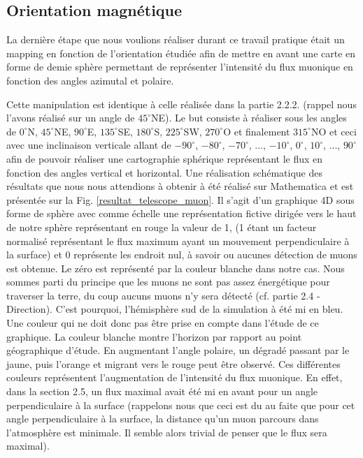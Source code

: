 \documentclass[12pt]{article}
\begin{document}
\subsection{Orientation magnétique}

La dernière étape que nous voulions réaliser durant ce travail pratique était un mapping en fonction de l'orientation étudiée afin de mettre en avant une carte en forme de demie sphère permettant de représenter l'intensité du flux muonique en fonction des angles azimutal et polaire.

Cette manipulation est identique à celle réalisée dans la partie 2.2.2. (rappel nous l'avons réalisé sur un angle de $45^{\circ}$NE). Le but consiste à réaliser sous les angles de $0^{\circ}$N, $45^{\circ}$NE, $90^{\circ}$E, $135^{\circ}$SE, $180^{\circ}$S, $225^{\circ}$SW, $270^{\circ}$O et finalement $315^{\circ}$NO et ceci avec une inclinaison verticale allant de $-90^{\circ}$, $-80^{\circ}$, $-70^{\circ}$, ..., $-10^{\circ}$, $0^{\circ}$, $10^{\circ}$, ..., $90^{\circ}$ afin de pouvoir réaliser une cartographie sphérique représentant le flux en fonction des angles vertical et horizontal. Une réalisation schématique des résultats que nous nous attendions à obtenir à été réalisé sur Mathematica et est présentée sur la Fig. \ref{resultat_telescope_muon}. Il s'agit d'un graphique 4D sous forme de sphère avec comme échelle une représentation fictive dirigée vers le haut de notre sphère représentant en rouge la valeur de 1, (1 étant un facteur normalisé représentant le flux maximum ayant un mouvement perpendiculaire à la surface) et 0 représente les endroit nul, à savoir ou aucunes détection de muons est obtenue. Le zéro est représenté par la couleur blanche dans notre cas. Nous sommes parti du principe que les muons ne sont pas assez énergétique pour traverser la terre, du coup aucuns muons n'y sera détecté (cf. partie 2.4 - Direction). C'est pourquoi, l'hémisphère sud de la simulation à été mi en bleu. Une couleur qui ne doit donc pas 
être prise en compte dans l'étude de ce graphique. La couleur blanche montre l'horizon par rapport au point géographique d'étude. En augmentant l'angle polaire, un dégradé passant par le jaune, puis l'orange et migrant vers le rouge peut être observé. Ces différentes couleurs représentent l'augmentation de l'intensité du flux muonique. En effet, dans la section 2.5, un flux maximal avait été mi en avant pour un angle perpendiculaire à la surface (rappelons nous que ceci est du au faite que pour cet angle perpendiculaire à la surface, la distance qu'un muon parcours dans l'atmosphère est minimale. Il semble alors trivial de penser que le flux sera maximal).
\end{document}
